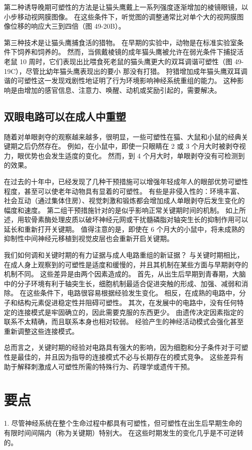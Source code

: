 第二种诱导晚期可塑性的方法是让猫头鹰戴上一系列强度逐渐增加的棱镜眼镜，以小步移动视网膜图像。 在这些条件下，听觉图的调整通常比对单个大的视网膜图像位移的响应大三到四倍（图 49-20B）。

第三种技术是让猫头鹰捕食活的猎物。 在早期的实验中，动物是在标准实验室条件下饲养和饲养的。 然而，当佩戴棱镜的成年猫头鹰被允许在弱光条件下捕捉活老鼠 10 周时，它们表现出比喂食死老鼠的猫头鹰更大的双耳调谐可塑性（图 49-19C），尽管比幼年猫头鹰表现出的要小 那没有打猎。 狩猎增加成年猫头鹰双耳调谐的可塑性这一发现戏剧性地证明了行为环境影响神经系统重组的能力。 这种影响是由增加的感官信息、注意力、唤醒、动机或奖励引起的，需要解决。

\subsection{双眼电路可以在成人中重塑}
随着对单眼剥夺的观察越来越多，很明显，一些可塑性在猫、大鼠和小鼠的经典关键期之后仍然存在。 例如，在小鼠中，即使一只眼睛在 2 或 3 个月大时被剥夺视力，眼优势也会发生适度的变化。 然而，到 4 个月大时，单眼剥夺没有可检测到的效果。

在过去的十年中，已经发现了几种干预措施可以增强年轻成年人的眼部优势可塑性程度，甚至可以使老年动物具有显着的可塑性。 有些是非侵入性的：环境丰富、社会互动（通过集体住房）、视觉刺激和锻炼都会增加成人单眼剥夺后发生变化的幅度和速度。 第二组干预措施针对的是似乎影响正常关键期时间的机制。 如上所述，用软骨素酶处理皮质以破坏神经元网或干扰髓磷脂对轴突生长的抑制作用可以延长和重新打开关键期。 值得注意的是，即使在 6 个月大的小鼠中，将未成熟的抑制性中间神经元移植到视觉皮层也会重新开启关键期。

我们如何调和关键时期的有力证据与成人电路重组的新证据？ 与关键时期相比，在成人身上观察到的可塑性是适度和缓慢的，并且其机制在某些方面与早期剥夺的机制不同。 这些差异是由两个因素造成的。 首先，从出生后早期到青春期，大脑中的分子环境有利于轴突生长，细胞机制最适合促进突触的形成、加强、减弱和消除。 在这些条件下，电路很容易根据经验发生变化。 相反，在成熟的电路中，分子和结构元素促进稳定性并阻碍可塑性。 其次，在发展中的电路中，没有任何特定的连接模式是牢固确立的，因此需要克服的东西更少。 由遗传决定因素指定的联系不太精确，而且联系本身也相对较弱。 经验产生的神经活动模式会强化甚至重新调整这些连接模式。

总而言之，关键时期的经验对电路具有强大的影响，因为细胞和分子条件对于可塑性是最佳的，并且因为指导的连接模式不必与长期存在的模式竞争。 这些差异有助于解释刺激成人可塑性所需的特殊行为、药理学或遗传干预。


\section{要点}
1. 尽管神经系统在整个生命过程中都具有可塑性，但可塑性在出生后早期生命的有限时间间隔内（称为关键期）特别大。 在这些时期发生的变化几乎是不可逆转的。 

